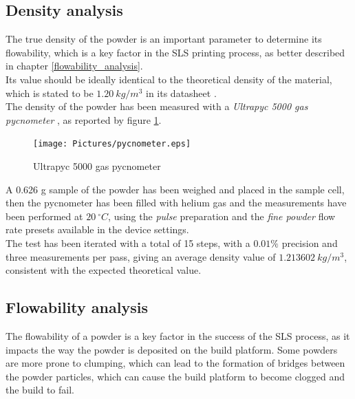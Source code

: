 \documentclass{article}
\begin{document}
        \clearpage

        \subsection{Density analysis\label{density_measurement}}

        The true density of the powder is an important parameter to determine its flowability, which is a key factor in the
        SLS printing process, as better described in chapter \ref{flowability_analysis}. \\
        
        Its value should be ideally identical to the theoretical density of the material, which is stated to be 
        $1.20 \ kg/m^3$ in its datasheet \autocites{GruppoMaip}. \\ 
        
        The density of the powder has been measured with a \textit{Ultrapyc 5000 gas
        pycnometer} \autocites{Ultrapyc5000}, as reported by figure \ref{fig:ultrapyc5000}. \\ 
    
        \begin{figure}[h!]
            \centering
            \texttt{[image: Pictures/pycnometer.eps]}
            \caption{Ultrapyc 5000 gas pycnometer}
            \label{fig:ultrapyc5000}
        \end{figure}
    
        A 0.626 g sample of the powder has been weighed and placed in the sample cell, then the pycnometer has been filled with 
        helium gas and the measurements have been performed at $20 \ ^{\circ}C$, using the \textit{pulse} preparation and the 
        \textit{fine powder} flow rate presets available in the device settings. \\ 
    
        The test has been iterated with a total of 15 steps, with a $0.01 \%$ precision and three measurements per pass, giving an average 
        density value of $1.213602 \ kg/m^3$, consistent with the expected theoretical value. \\ 
    
        \clearpage

        \subsection{Flowability analysis\label{flowability_analysis}}

        The flowability of a powder is a key factor in the success of the SLS process, as it impacts the way the powder is deposited
        on the build platform. Some powders are more prone to clumping, which can lead to the formation of bridges between the powder 
        particles, which can cause the build platform to become clogged and the build to fail. \\ 
\end{document}
